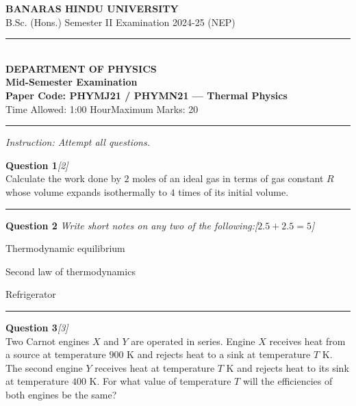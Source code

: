 \documentclass[11pt,a4paper]{article}
\newcommand{\pts}[1]{\hfill   \textit{[#1]}}
\begin{document}
\begin{center}
  {\large\bfseries BANARAS HINDU UNIVERSITY}\\[2pt]
  {\normalsize B.Sc. (Hons.) Semester II Examination 2024-25 (NEP)}\\[6pt]
  \rule{0.8\linewidth}{0.5pt}\\[6pt]
  {\large\bfseries DEPARTMENT OF PHYSICS}\\[4pt]
  {\large\bfseries Mid-Semester Examination}\\[4pt]
  {\large\bfseries Paper Code: PHYMJ21 / PHYMN21 --- Thermal Physics}\\[4pt]
  {\normalsize Time Allowed: 1:00 Hour\hfill Maximum Marks: 20}
\end{center}

\rule{\linewidth}{0.4pt}\smallskip



\noindent   \textit{Instruction: Attempt all questions.}
\bigskip




\noindent   \textbf{Question 1}\pts{2} \\
Calculate the work done by $2 \text{ moles}$ of an ideal gas in terms of gas constant $R$ whose volume expands isothermally to $4$ times of its initial volume.

\medskip\rule{\linewidth}{0.2pt}\medskip




\noindent   \textbf{Question 2}   \textit{Write short notes on any two of the following:}\pts{$2.5 + 2.5 = 5$}

\begin{parts}
  \item Thermodynamic equilibrium
  \item Second law of thermodynamics
  \item Refrigerator
\end{parts}

\medskip\rule{\linewidth}{0.2pt}\medskip




\noindent   \textbf{Question 3}\pts{3} \\
Two Carnot engines $X$ and $Y$ are operated in series. Engine $X$ receives heat from a source at temperature $900 \text{ K}$ and rejects heat to a sink at temperature $T \text{ K}$. The second engine $Y$ receives heat at temperature $T \text{ K}$ and rejects heat to its sink at temperature $400 \text{ K}$. For what value of temperature $T$ will the efficiencies of both engines be the same?
\end{document}
